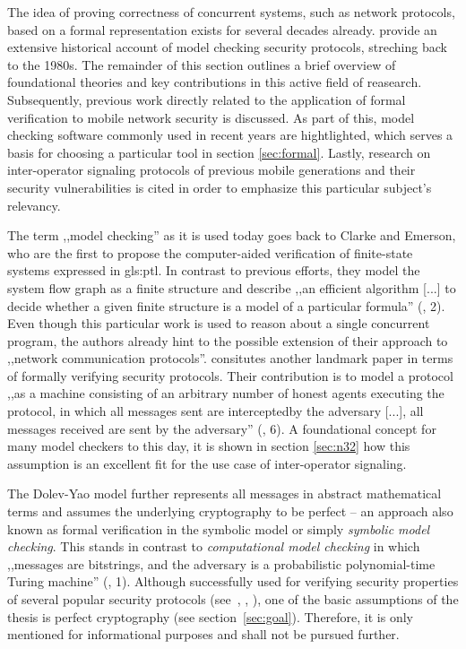 The idea of proving correctness of concurrent systems, such as network protocols, based on a formal representation exists for several decades already.
\cite{basin2018model} provide an extensive historical account of model checking security protocols, streching back to the 1980s.
The remainder of this section outlines a brief overview of foundational theories and key contributions in this active field of reasearch.
Subsequently, previous work directly related to the application of formal verification to mobile network security is discussed.
As part of this, model checking software commonly used in recent years are hightlighted, which serves a basis for choosing a particular tool in section \ref{sec:formal}.
Lastly, research on inter-operator signaling protocols of previous mobile generations and their security vulnerabilities is cited in order to emphasize this particular subject's relevancy.

The term ,,model checking'' as it is used today goes back to Clarke and Emerson, who are the first to propose the computer-aided verification of finite-state systems expressed in \gls{gls:ptl}.
In contrast to previous efforts, they model the system flow graph as a finite structure and describe ,,an efficient algorithm [...] to decide whether a given finite structure is a model of a particular formula'' (\cite{clarke1981design}, 2).
Even though this particular work is used to reason about a single concurrent program, the authors already hint to the possible extension of their approach to ,,network communication protocols''.
\cite{dolev1983security} consitutes another landmark paper in terms of formally verifying security protocols.
Their contribution is to model a protocol ,,as a machine consisting of an arbitrary number of honest agents executing the protocol, in which all messages sent are interceptedby the adversary [...], all messages received are sent by the adversary'' (\cite{basin2018model}, 6).
A foundational concept for many model checkers to this day, it is shown in section \ref{sec:n32} how this assumption is an excellent fit for the use case of inter-operator signaling.

The Dolev-Yao model further represents all messages in abstract mathematical terms and assumes the underlying cryptography to be perfect -- an approach also known as formal verification in the symbolic model or simply \textit{symbolic model checking}.
This stands in contrast to \textit{computational model checking} in which ,,messages are bitstrings, and the adversary is a probabilistic polynomial-time Turing machine'' (\cite{blanchet2008computationally}, 1).
Although successfully used for verifying security properties of several popular security protocols (see~\cite{BlanchetJaggardScedrovTsayAsiaCCS08}, \cite{CadeBlanchetJoWUA13}, \cite{LippBlanchetBhargavanEuroSP19}), one of the basic assumptions of the thesis is perfect cryptography (see section~\ref{sec:goal}).
Therefore, it is only mentioned for informational purposes and shall not be pursued further.

